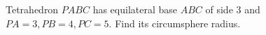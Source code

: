 Tetrahedron $PABC$ has equilateral base $ABC$ of side $3$ and $PA=3,PB=4,PC=5$. Find its circumsphere radius.
